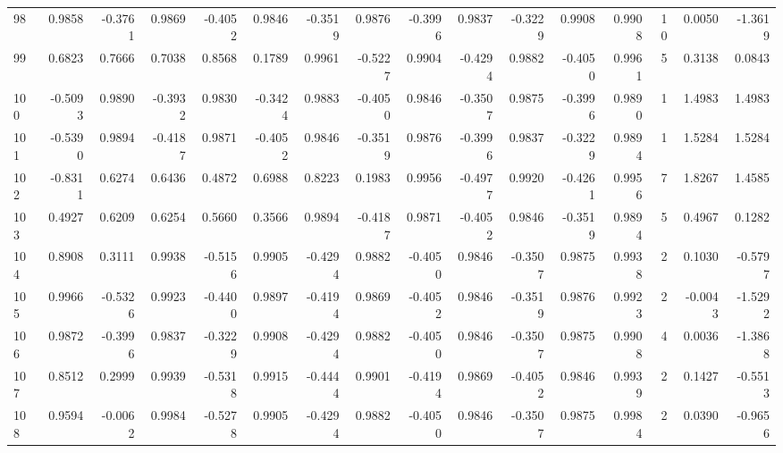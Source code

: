 \begin{tabular}{lrrrrrrrrrrrrrrr}
98  &      0.9858 & -0.3761 &  0.9869 & -0.4052 &  0.9846 & -0.3519 &  0.9876 & -0.3996 &  0.9837 & -0.3229 &   0.9908 &     0.9908 &     10 &                    0.0050 &                    -1.3619 \\
99  &      0.6823 &  0.7666 &  0.7038 &  0.8568 &  0.1789 &  0.9961 & -0.5227 &  0.9904 & -0.4294 &  0.9882 &  -0.4050 &     0.9961 &      5 &                    0.3138 &                     0.0843 \\
100 &     -0.5093 &  0.9890 & -0.3932 &  0.9830 & -0.3424 &  0.9883 & -0.4050 &  0.9846 & -0.3507 &  0.9875 &  -0.3996 &     0.9890 &      1 &                    1.4983 &                     1.4983 \\
101 &     -0.5390 &  0.9894 & -0.4187 &  0.9871 & -0.4052 &  0.9846 & -0.3519 &  0.9876 & -0.3996 &  0.9837 &  -0.3229 &     0.9894 &      1 &                    1.5284 &                     1.5284 \\
102 &     -0.8311 &  0.6274 &  0.6436 &  0.4872 &  0.6988 &  0.8223 &  0.1983 &  0.9956 & -0.4977 &  0.9920 &  -0.4261 &     0.9956 &      7 &                    1.8267 &                     1.4585 \\
103 &      0.4927 &  0.6209 &  0.6254 &  0.5660 &  0.3566 &  0.9894 & -0.4187 &  0.9871 & -0.4052 &  0.9846 &  -0.3519 &     0.9894 &      5 &                    0.4967 &                     0.1282 \\
104 &      0.8908 &  0.3111 &  0.9938 & -0.5156 &  0.9905 & -0.4294 &  0.9882 & -0.4050 &  0.9846 & -0.3507 &   0.9875 &     0.9938 &      2 &                    0.1030 &                    -0.5797 \\
105 &      0.9966 & -0.5326 &  0.9923 & -0.4400 &  0.9897 & -0.4194 &  0.9869 & -0.4052 &  0.9846 & -0.3519 &   0.9876 &     0.9923 &      2 &                   -0.0043 &                    -1.5292 \\
106 &      0.9872 & -0.3996 &  0.9837 & -0.3229 &  0.9908 & -0.4294 &  0.9882 & -0.4050 &  0.9846 & -0.3507 &   0.9875 &     0.9908 &      4 &                    0.0036 &                    -1.3868 \\
107 &      0.8512 &  0.2999 &  0.9939 & -0.5318 &  0.9915 & -0.4444 &  0.9901 & -0.4194 &  0.9869 & -0.4052 &   0.9846 &     0.9939 &      2 &                    0.1427 &                    -0.5513 \\
108 &      0.9594 & -0.0062 &  0.9984 & -0.5278 &  0.9905 & -0.4294 &  0.9882 & -0.4050 &  0.9846 & -0.3507 &   0.9875 &     0.9984 &      2 &                    0.0390 &                    -0.9656 \\

\end{tabular}
